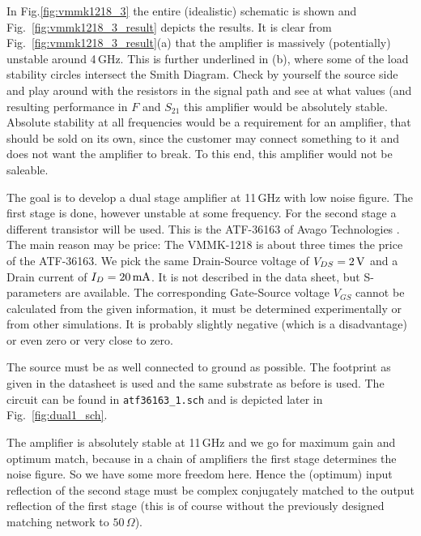 In Fig.\ref{fig:vmmk1218_3} the entire (idealistic) schematic is shown
and Fig.~\ref{fig:vmmk1218_3_result} depicts the results. It is clear
from Fig.~\ref{fig:vmmk1218_3_result}(a)
that the amplifier is massively (potentially) unstable around
4\,GHz. This is further underlined in (b), where some of the load
stability circles intersect the Smith Diagram. Check by yourself the
source side and play around with the resistors in the signal path and
see at what values (and resulting performance in $F$ and $S_{21}$ this
amplifier would be absolutely stable. Absolute stability at all
frequencies would be a requirement for an amplifier, that should be
sold on its own, since the customer may connect something to it and
does not want the amplifier to break. To this end, this amplifier
would not be saleable. 


The goal is to develop a dual stage amplifier at 11\,GHz with low
noise figure. The first stage is done, however unstable at some
frequency. For the second stage a different transistor will be
used. This is the ATF-36163 of Avago Technologies
\cite{avagoatf36163}. The main reason may be price: The VMMK-1218 is
about three times the price of the ATF-36163. We pick the same
Drain-Source voltage of $V_{DS}=2\,\mathrm{V}$ and a Drain current of
$I_D=20\,\mathrm{mA}$. It is not described in the data sheet, but
S-parameters are available. The corresponding Gate-Source voltage
$V_{GS}$ cannot be calculated from the given information, it must be
determined experimentally or from other simulations. It is probably
slightly negative (which is a disadvantage) or even zero or very close
to zero.

The source must be as well connected to ground as possible. The
footprint as given in the datasheet is used and the same substrate as
before is used. The circuit can be found in \texttt{atf36163\_1.sch} and
is depicted later in Fig.~\ref{fig:dual1_sch}.


The amplifier is absolutely stable at 11\,GHz and we go for
maximum gain and optimum match, because in a chain of amplifiers the
first stage determines the noise figure. So we have some more freedom
here. Hence the (optimum) input reflection of the second stage must be
complex conjugately matched to the output reflection of the first
stage (this is of course without the previously designed matching
network to $50\,\Omega$).

